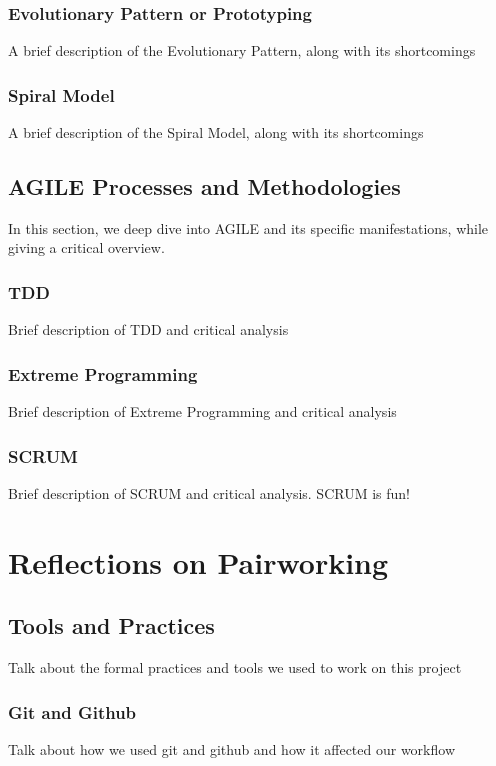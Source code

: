 \documentclass[11pt]{article}
\begin{document}
\subsubsection{Evolutionary Pattern or Prototyping}
A brief description of the Evolutionary Pattern, along with its shortcomings

\subsubsection{Spiral Model}
A brief description of the Spiral Model, along with its shortcomings

\subsection{AGILE Processes and Methodologies}
In this section, we deep dive into AGILE and its specific manifestations, while giving a critical overview.

\subsubsection{TDD}
Brief description of TDD and critical analysis

\subsubsection{Extreme Programming}
Brief description of Extreme Programming and critical analysis

\subsubsection{SCRUM}
Brief description of SCRUM and critical analysis. SCRUM is fun!

\section{Reflections on Pairworking}

\subsection{Tools and Practices}
Talk about the formal practices and tools we used to work on this project

\subsubsection{Git and Github}
Talk about how we used git and github and how it affected our workflow
\end{document}
